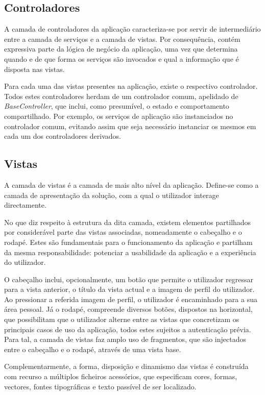 \documentclass[12pt]{report}
\begin{document}
\clearpage

\subsection{Controladores}

A camada de controladores da aplicação caracteriza-se por servir de intermediário entre a camada de serviços e a camada de vistas. Por consequência, contém expressiva parte da lógica de negócio da aplicação, uma vez que determina quando e de que forma os serviços são invocados e qual a informação que é disposta nas vistas. 

Para cada uma das vistas presentes na aplicação, existe o respectivo controlador. Todos estes controladores herdam de um controlador comum, apelidado de \emph{BaseController}, que inclui, como presumível, o estado e comportamento compartilhado. Por exemplo, os serviços de aplicação são instanciados no controlador comum, evitando assim que seja necessário instanciar os mesmos em cada um dos controladores derivados.

\subsection{Vistas}

A camada de vistas é a camada de mais alto nível da aplicação. Define-se como a camada de apresentação da solução, com a qual o utilizador interage directamente. 

No que diz respeito à estrutura da dita camada, existem elementos partilhados por considerável parte das vistas associadas, nomeadamente o cabeçalho e o rodapé. Estes são fundamentais para o funcionamento da aplicação e partilham da mesma responsabilidade: potenciar a usabilidade da aplicação e a experiência do utilizador.

O cabeçalho inclui, opcionalmente, um botão que permite o utilizador regressar para a vista anterior, o título da vista actual e a  imagem de perfil do utilizador. Ao pressionar a referida imagem de perfil, o utilizador é encaminhado para a sua área pessoal. Já o rodapé, compreende diversos botões, dispostos na horizontal, que possibilitam que o utilizador alterne entre as vistas que concretizam os principais casos de uso da aplicação, todos estes sujeitos a autenticação prévia. Para tal, a camada de vistas faz amplo uso de fragmentos, que são injectados entre o cabeçalho e o rodapé, através de uma vista base.

Complementarmente, a forma, disposição e dinamismo das vistas é construída com recurso a múltiplos ficheiros acessórios, que especificam cores, formas, vectores, fontes tipográficas e texto passível de ser localizado.
\end{document}
